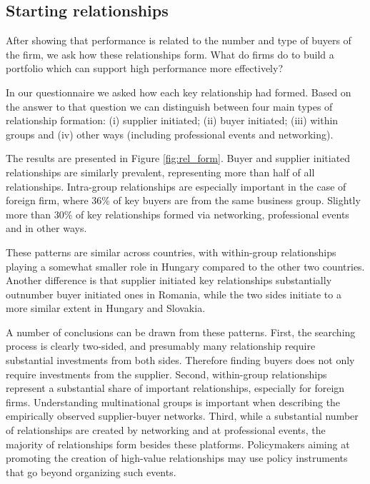 \usepackage{}\documentclass[final, dvipsnames, authoryear,12pt]{elsarticle}
\begin{document}
\subsection{Starting relationships}

After showing that performance is related to the number and type of buyers of the firm, we ask how these relationships form. What do firms do to build a portfolio which can support high performance more effectively?

In our questionnaire we asked how each key relationship had formed. Based on the answer to that question we can distinguish between four main types of relationship formation: (i) supplier initiated; (ii) buyer initiated; (iii) within groups and (iv) other ways (including professional events and networking). 

The results are presented in Figure \ref{fig:rel_form}. Buyer and supplier initiated relationships are similarly prevalent, representing more than half of all relationships. Intra-group relationships are especially important in the case of foreign firm, where 36\% of key buyers are from the same business group. Slightly more than 30\% of key relationships formed via networking, professional events and in other ways. 

These patterns are similar across countries, with within-group relationships playing a somewhat smaller role in Hungary compared to the other two countries. Another difference is that supplier initiated key relationships substantially outnumber buyer initiated ones in Romania, while the two sides initiate to a more similar extent in Hungary and Slovakia.

A number of conclusions can be drawn from these patterns. First, the searching process is clearly two-sided, and presumably many relationship require substantial investments from both sides. Therefore finding buyers does not only require investments from the supplier. Second, within-group relationships represent a substantial share of important relationships, especially for foreign firms. Understanding multinational groups is important when describing the empirically observed supplier-buyer networks. Third, while a substantial number of relationships are created by networking and at professional events, the majority of relationships form besides these platforms. Policymakers aiming at promoting the creation of high-value relationships may use policy instruments that go beyond organizing such events. 
\end{document}
